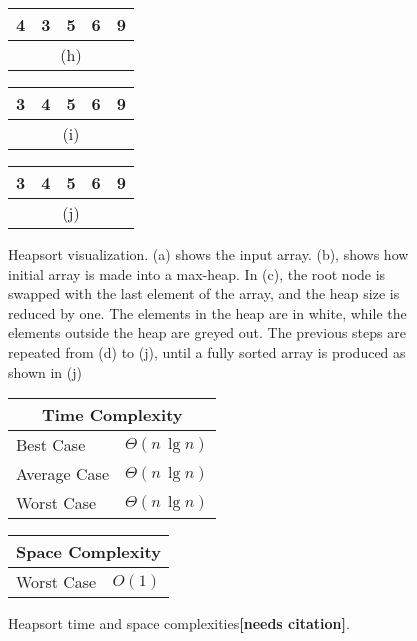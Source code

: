 \begin{figure}[!ht]
\begin{tabular}{|c|c|c|c|c|}
    \hline
    4 & 3 & \cellcolor{lightgray}5 & \cellcolor{lightgray}6 & \cellcolor{lightgray}9 \\
    \hline
    \multicolumn{5}{c}{(h)} \\
    \end{tabular}
    \break
    \begin{tabular}{|c|c|c|c|c|}
    \hline
    3 & \cellcolor{lightgray}4 & \cellcolor{lightgray}5 & \cellcolor{lightgray}6 & \cellcolor{lightgray}9 \\
    \hline
    \multicolumn{5}{c}{(i)} \\
    \end{tabular}
    \quad\quad\quad
    \begin{tabular}{|c|c|c|c|c|}
    \hline
    \cellcolor{lightgray}3 & \cellcolor{lightgray}4 & \cellcolor{lightgray}5 & \cellcolor{lightgray}6 & \cellcolor{lightgray}9 \\
    \hline
    \multicolumn{5}{c}{(j)} \\
    \end{tabular}
    
    \caption{Heapsort visualization. (a) shows the input array. (b),  shows how initial array is made into a max-heap. In (c), the root node is swapped with the last element of the array, and the heap size is reduced by one. The elements in the heap are in white, while the elements outside the heap are greyed out. The previous steps are repeated from (d) to (j), until a fully sorted array is produced as shown in (j)}
    \label{fig:heapsort_ex}
\end{figure}

\begin{figure}[!ht]
    \centering
    \begin{tabular}{l|l}
    \multicolumn{2}{c}{\textbf{Time Complexity}} \\
    \hline
    Best Case    & $\Theta(n \, \lg n)$ \\
    Average Case & $\Theta(n \, \lg n)$ \\
    Worst Case   & $\Theta(n \, \lg n)$ \\
    \end{tabular}
    \quad\quad
    \begin{tabular}{l|l}
    \multicolumn{2}{c}{\textbf{Space Complexity}} \\
    \hline
    Worst Case   & $O(1)$
    \end{tabular}
    
    \caption{Heapsort time\cite{clrs2009} and space complexities\textbf{[needs citation]}.}
    \label{fig:heapsort}
\end{figure}


